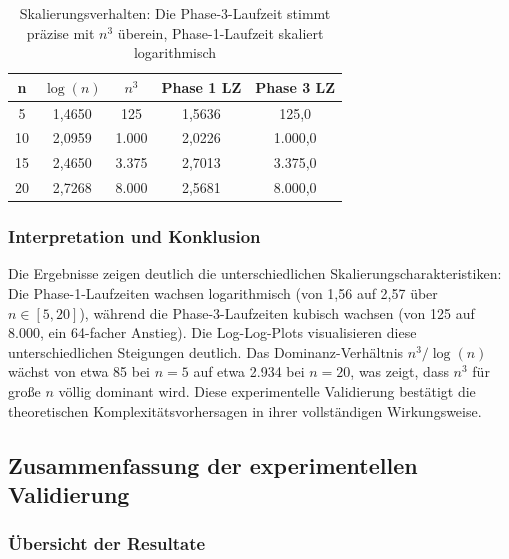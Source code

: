 ﻿\documentclass[a4paper,12pt]{article}
\theoremstyle{definition}
\begin{document}
\begin{table}[h]
	\centering
	\begin{tabular}{|c|c|c|c|c|}
		\hline
		\textbf{n} & \textbf{$\log(n)$} & \textbf{$n^3$} & \textbf{Phase 1 LZ} & \textbf{Phase 3 LZ} \\
		\hline
		5 & 1,4650 & 125 & 1,5636 & 125,0 \\
		\hline
		10 & 2,0959 & 1.000 & 2,0226 & 1.000,0 \\
		\hline
		15 & 2,4650 & 3.375 & 2,7013 & 3.375,0 \\
		\hline
		20 & 2,7268 & 8.000 & 2,5681 & 8.000,0 \\
		\hline
	\end{tabular}
	\caption{Skalierungsverhalten: Die Phase-3-Laufzeit stimmt präzise mit $n^3$ überein, Phase-1-Laufzeit skaliert logarithmisch}
	\label{tab:exp10_scaling}
\end{table}

\subsubsection{Interpretation und Konklusion}

Die Ergebnisse zeigen deutlich die unterschiedlichen Skalierungscharakteristiken: Die Phase-1-Laufzeiten wachsen logarithmisch (von 1,56 auf 2,57 über $n \in [5, 20]$), während die Phase-3-Laufzeiten kubisch wachsen (von 125 auf 8.000, ein 64-facher Anstieg). Die Log-Log-Plots visualisieren diese unterschiedlichen Steigungen deutlich. Das Dominanz-Verhältnis $n^3 / \log(n)$ wächst von etwa 85 bei $n=5$ auf etwa 2.934 bei $n=20$, was zeigt, dass $n^3$ für große $n$ völlig dominant wird. Diese experimentelle Validierung bestätigt die theoretischen Komplexitätsvorhersagen in ihrer vollständigen Wirkungsweise.


\subsection{Zusammenfassung der experimentellen Validierung}

\subsubsection{Übersicht der Resultate}
\end{document}

